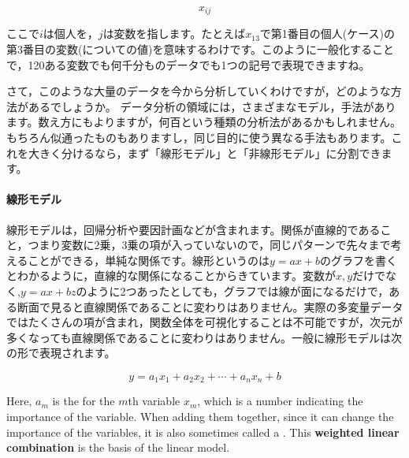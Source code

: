\documentclass{ltjsbook}
\begin{document}
\[ x_{ij }\]

ここで$i$は個人を，$j$は変数を指します。たとえば$x_{13}$で第1番目の個人(ケース)の第3番目の変数(についての値)を意味するわけです。このように一般化することで，120ある変数でも何千分ものデータでも1つの記号で表現できますね。

さて，このような大量のデータを今から分析していくわけですが，どのような方法があるでしょうか。
データ分析の領域には，さまざまなモデル，手法があります。数え方にもよりますが，何百という種類の分析法があるかもしれません。もちろん似通ったものもありますし，同じ目的に使う異なる手法もあります。これを大きく分けるなら，まず「線形モデル」と「非線形モデル」に分割できます。

\paragraph{線形モデル}線形モデルは，回帰分析や要因計画などが含まれます。関係が直線的であること，つまり変数に2乗，3乗の項が入っていないので，同じパターンで先々まで考えることができる，単純な関係です。線形というのは$y=ax+b$のグラフを書くとわかるように，直線的な関係になることからきています。変数が$x,y$だけでなく,$y = ax + bz$のように2つあったとしても，グラフでは線が面になるだけで，ある断面で見ると直線関係であることに変わりはありません。実際の多変量データではたくさんの項が含まれ，関数全体を可視化することは不可能ですが，次元が多くなっても直線関係であることに変わりはありません。一般に線形モデルは次の形で表現されます。

\[ y = a_1 x_1 + a_2 x_2 + \cdots + a_n x_n + b\]

Here, $a_m$ is the  for the $m$th variable $x_m$, which is a number indicating the importance of the variable. When adding them together, since it can change the importance of the variables, it is also sometimes called a . This \textbf{weighted linear combination} is the basis of the linear model.
\end{document}
